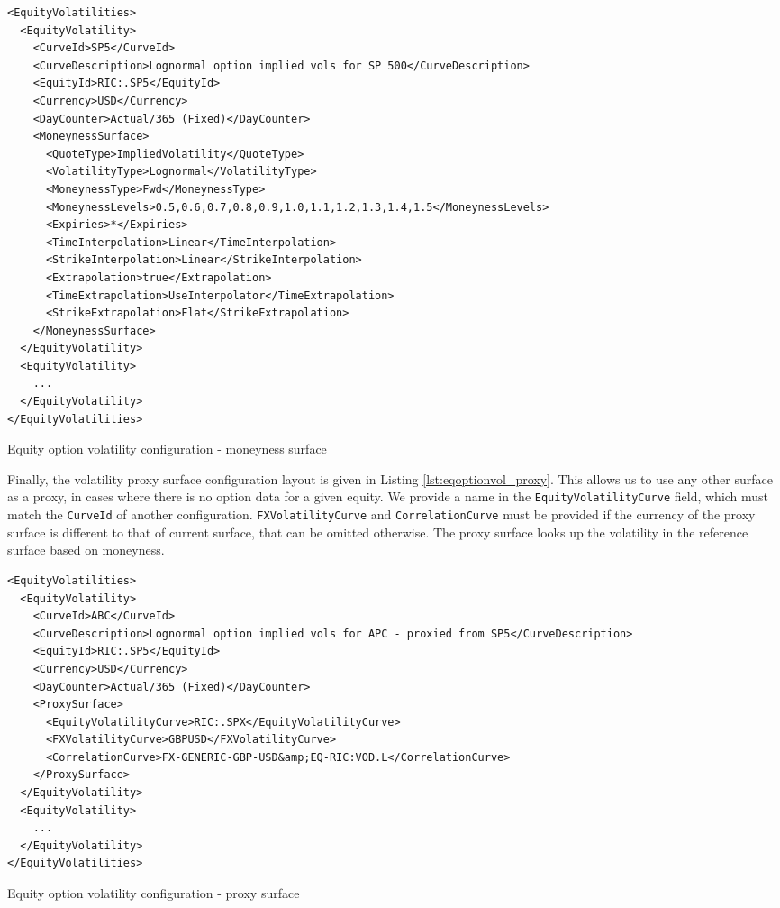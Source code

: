 \begin{longlisting}
\begin{verbatim}
<EquityVolatilities>
  <EquityVolatility>
    <CurveId>SP5</CurveId>
    <CurveDescription>Lognormal option implied vols for SP 500</CurveDescription>
    <EquityId>RIC:.SP5</EquityId>
    <Currency>USD</Currency>
    <DayCounter>Actual/365 (Fixed)</DayCounter>
    <MoneynessSurface>
      <QuoteType>ImpliedVolatility</QuoteType>
      <VolatilityType>Lognormal</VolatilityType>
      <MoneynessType>Fwd</MoneynessType>
      <MoneynessLevels>0.5,0.6,0.7,0.8,0.9,1.0,1.1,1.2,1.3,1.4,1.5</MoneynessLevels>
      <Expiries>*</Expiries>
      <TimeInterpolation>Linear</TimeInterpolation>
      <StrikeInterpolation>Linear</StrikeInterpolation>
      <Extrapolation>true</Extrapolation>
      <TimeExtrapolation>UseInterpolator</TimeExtrapolation>
      <StrikeExtrapolation>Flat</StrikeExtrapolation>
    </MoneynessSurface>
  </EquityVolatility>
  <EquityVolatility>
    ...
  </EquityVolatility>
</EquityVolatilities>
\end{verbatim}
\caption{Equity option volatility configuration - moneyness surface}
\label{lst:eqoptionvol_mny_surface}
\end{longlisting}

Finally, the volatility proxy surface configuration layout is given in Listing \ref{lst:eqoptionvol_proxy}. This allows us to use any other surface as a proxy, in cases where there is no option data for a given equity. We provide a name in the \lstinline!EquityVolatilityCurve! field, which must match the \lstinline!CurveId! of another configuration.  \lstinline!FXVolatilityCurve! and \lstinline!CorrelationCurve! must be provided if the currency of the proxy surface is different to that of current surface, that can be omitted otherwise. The proxy surface looks up the volatility in the reference surface based on moneyness.

\begin{longlisting}
\begin{verbatim}
<EquityVolatilities>
  <EquityVolatility>
    <CurveId>ABC</CurveId>
    <CurveDescription>Lognormal option implied vols for APC - proxied from SP5</CurveDescription>
    <EquityId>RIC:.SP5</EquityId>
    <Currency>USD</Currency>
    <DayCounter>Actual/365 (Fixed)</DayCounter>
    <ProxySurface>
      <EquityVolatilityCurve>RIC:.SPX</EquityVolatilityCurve>
      <FXVolatilityCurve>GBPUSD</FXVolatilityCurve>
      <CorrelationCurve>FX-GENERIC-GBP-USD&amp;EQ-RIC:VOD.L</CorrelationCurve>
    </ProxySurface>
  </EquityVolatility>
  <EquityVolatility>
    ...
  </EquityVolatility>
</EquityVolatilities>
\end{verbatim}
\caption{Equity option volatility configuration - proxy surface}
\label{lst:eqoptionvol_proxy}
\end{longlisting}

